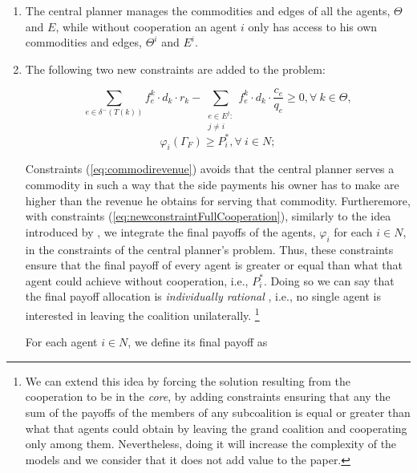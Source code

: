 \documentclass{article}
\begin{document}
\begin{enumerate}
	\item The central planner manages the commodities and edges of
all the agents, $\Theta$ and $E$, while without cooperation an agent $i$ only has access to his own commodities and edges, $\Theta^i$ and $E^i$.
	\item The following two new constraints are added to the problem:

\begin{equation}
\sum_{e \in \delta^-(T(k))}  f_e^k \cdot d_k \cdot r_k - \sum_{\substack{e \in E^j\colon \\ j\not = i}} f_e^k \cdot d_k \cdot \frac{c_e}{q_e}\geq 0,  \forall\ k \in \Theta, \label{eq:commodirevenue}
\end{equation}
\begin{equation}
\varphi_i(\Gamma_F) \geq P_i^*,  \forall\ i\in N; \label{eq:newconstraintFullCooperation}
\end{equation}

Constraints (\ref{eq:commodirevenue}) avoids that the central planner serves a commodity in such a way that the side payments his owner has to make are higher than the revenue he obtains for serving that commodity. Furtheremore, with constraints (\ref{eq:newconstraintFullCooperation}), similarly to the idea introduced by \cite{VANOVERMEIRE2014125}, we integrate the final payoffs of the agents, $\varphi_i$ for each $i \in N$, in the constraints of the central planner's problem. Thus, these constraints  ensure that the final payoff of every agent is greater or equal than what that agent could achieve without cooperation, i.e., $P_i^*$.  Doing so we can say that the final payoff allocation is \emph{individually rational} \parencite{GONZALEZ2010}, i.e., no single agent is interested in leaving the coalition unilaterally.  \footnote{We can extend this idea by forcing the solution resulting from the cooperation to be in the \emph{core}, by adding constraints ensuring that any the sum of the payoffs of the members of any subcoalition is equal or greater than what that agents could obtain by leaving the grand coalition and cooperating only among them. Nevertheless, doing it will increase the complexity of the models and we consider that it does not add value to the paper.}

For each agent $i\in N$, we define its final payoff as


\end{enumerate}
\end{document}
